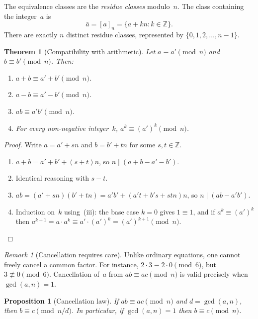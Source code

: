 \documentclass[12pt,a4paper,openany]{book}
\theoremstyle{definition}
\theoremstyle{plain}
\newtheorem{theorem}[definition]{Theorem}
\newtheorem{proposition}[definition]{Proposition}
\theoremstyle{remark}
\newtheorem{remark}[definition]{Remark}
\newcommand{\Z}{\mathbb{Z}}
\begin{document}
The equivalence classes are the \emph{residue classes} modulo~$n$.
The class containing the integer~$a$ is
\[
  \bar{a} = [a]_n = \{ a + kn : k \in \Z \}.
\]
There are exactly $n$ distinct residue classes, represented by
$\{0, 1, 2, \dots, n-1\}$.

\begin{theorem}[Compatibility with arithmetic]
\label{thm:cong-arith}
Let $a \equiv a' \pmod{n}$ and $b \equiv b' \pmod{n}$.  Then:
\begin{enumerate}[label=(\roman*)]
  \item $a + b \equiv a' + b' \pmod{n}$.
  \item $a - b \equiv a' - b' \pmod{n}$.
  \item $ab \equiv a'b' \pmod{n}$.
  \item For every non-negative integer~$k$, $a^k \equiv (a')^k \pmod{n}$.
\end{enumerate}
\end{theorem}

\begin{proof}
Write $a = a' + sn$ and $b = b' + tn$ for some $s,t \in \Z$.
\begin{enumerate}[label=(\roman*)]
  \item $a + b = a' + b' + (s + t)n$, so $n \mid (a + b - a' - b')$.
  \item Identical reasoning with $s - t$.
  \item $ab = (a' + sn)(b' + tn) = a'b' + (a't + b's + stn)n$, so
        $n \mid (ab - a'b')$.
  \item Induction on~$k$ using~(iii): the base case $k = 0$ gives $1 \equiv 1$,
        and if $a^k \equiv (a')^k$ then
        $a^{k+1} = a \cdot a^k \equiv a' \cdot (a')^k = (a')^{k+1} \pmod{n}$.
        \qedhere
\end{enumerate}
\end{proof}

\begin{remark}[Cancellation requires care]
\label{rem:cancel-care}
Unlike ordinary equations, one cannot freely cancel a common factor.
For instance, $2 \cdot 3 \equiv 2 \cdot 0 \pmod{6}$, but $3 \not\equiv 0
\pmod{6}$.  Cancellation of~$a$ from $ab \equiv ac \pmod{n}$ is valid
precisely when $\gcd(a, n) = 1$.
\end{remark}

\begin{proposition}[Cancellation law]
\label{prop:cancel}
If $ab \equiv ac \pmod{n}$ and $d = \gcd(a,n)$, then
$b \equiv c \pmod{n/d}$.  In particular, if $\gcd(a,n)=1$ then
$b \equiv c \pmod{n}$.
\end{proposition}
\end{document}

